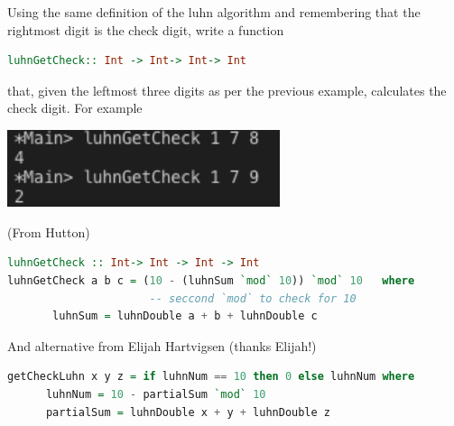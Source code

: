 \documentclass{article}
\begin{document}
\begin{Exercise}
Using the same definition of the luhn algorithm and remembering that the rightmost digit is the check digit, write a function 
\begin{lstlisting}[language=Haskell]
luhnGetCheck:: Int -> Int-> Int-> Int
\end{lstlisting}
that, given the leftmost three digits as per the previous example, calculates the check digit. 
For example 
\begin{center}
	\includegraphics[width=8cm]{img/04.png}
\end{center}

\end{Exercise}
\begin{Answer}
(From Hutton) 
\begin{lstlisting}[language=Haskell]
luhnGetCheck :: Int-> Int -> Int -> Int
luhnGetCheck a b c = (10 - (luhnSum `mod` 10)) `mod` 10   where  
                      -- seccond `mod` to check for 10
       luhnSum = luhnDouble a + b + luhnDouble c 

\end{lstlisting}
And alternative from Elijah Hartvigsen (thanks Elijah!)
\begin{lstlisting}[language=Haskell]
    getCheckLuhn x y z = if luhnNum == 10 then 0 else luhnNum where
      luhnNum = 10 - partialSum `mod` 10
      partialSum = luhnDouble x + y + luhnDouble z
  \end{lstlisting}
\end{Answer}
\end{document}
